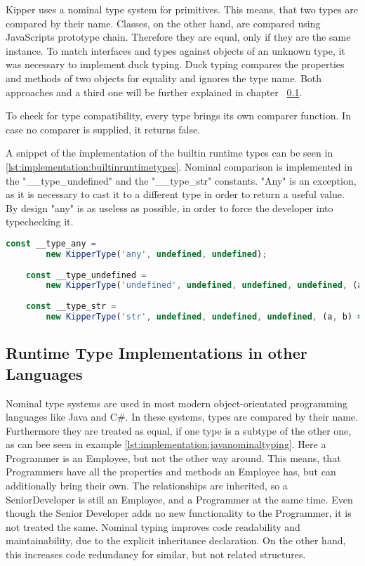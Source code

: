  Kipper uses a nominal type system for primitives. This means, that two types are compared by their name. Classes, on the other hand, are compared using JavaScripts prototype chain. Therefore they are equal, only if they are the same instance.   To match interfaces and types against objects of an unknown type, it was necessary to implement duck typing. Duck typing compares the properties and methods of two objects for equality and ignores the type name. Both approaches and a third one will be further explained in chapter ~\ref{chap:runtime-other-languages}. 

To check for type compatibility, every type brings its own comparer function. In case no comparer is supplied, it returns false.

 A snippet of the implementation of the builtin runtime types can be seen in \ref{lst:implementation:builtinruntimetypes}. Nominal comparison is implemented in the "\_\_type\_undefined" and the "\_\_type\_str" constants. "Any" is an exception, as it is necessary to cast it to a different type in order to return a useful value. By design "any" is as useless as possible, in order to force the developer into typechecking it.

\begin{lstlisting}[language=TypeScript,caption=The builtin runtime types,label=lst:implementation:builtinruntimetypes]
	const __type_any = 
		new KipperType('any', undefined, undefined);
		
	const __type_undefined = 
		new KipperType('undefined', undefined, undefined, undefined, (a, b) => a.name === b.name);
		
	const __type_str = 
		new KipperType('str', undefined, undefined, undefined, (a, b) => a.name === b.name);
\end{lstlisting}

\subsection{Runtime Type Implementations in other Languages}
\label{chap:runtime-other-languages}
Nominal type systems are used in most modern object-orientated programming languages like Java and C\#.  In these systems, types are compared by their name. Furthermore they are treated as equal, if one type is a subtype of the other one, as can bee seen in example \ref{lst:implementation:javanominaltyping}. Here a Programmer is an Employee, but not the other way around. This means, that Programmers have all the properties and methods an Employee has, but can additionally bring their own. The relationships are inherited, so a SeniorDeveloper is still an Employee, and a Programmer at the same time. Even though the Senior Developer adds no new functionality to the Programmer, it is not treated the same. Nominal typing improves code readability and maintainability, due to the explicit inheritance declaration. On the other hand, this increases code redundancy for similar, but not related structures.


